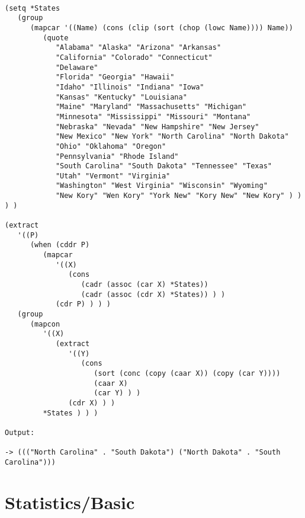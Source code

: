 \begin{verbatim}

(setq *States
   (group
      (mapcar '((Name) (cons (clip (sort (chop (lowc Name)))) Name))
         (quote
            "Alabama" "Alaska" "Arizona" "Arkansas"
            "California" "Colorado" "Connecticut"
            "Delaware"
            "Florida" "Georgia" "Hawaii"
            "Idaho" "Illinois" "Indiana" "Iowa"
            "Kansas" "Kentucky" "Louisiana"
            "Maine" "Maryland" "Massachusetts" "Michigan"
            "Minnesota" "Mississippi" "Missouri" "Montana"
            "Nebraska" "Nevada" "New Hampshire" "New Jersey"
            "New Mexico" "New York" "North Carolina" "North Dakota"
            "Ohio" "Oklahoma" "Oregon"
            "Pennsylvania" "Rhode Island"
            "South Carolina" "South Dakota" "Tennessee" "Texas"
            "Utah" "Vermont" "Virginia"
            "Washington" "West Virginia" "Wisconsin" "Wyoming"
            "New Kory" "Wen Kory" "York New" "Kory New" "New Kory" ) ) ) )

(extract
   '((P)
      (when (cddr P)
         (mapcar
            '((X)
               (cons
                  (cadr (assoc (car X) *States))
                  (cadr (assoc (cdr X) *States)) ) )
            (cdr P) ) ) )
   (group
      (mapcon
         '((X)
            (extract
               '((Y)
                  (cons
                     (sort (conc (copy (caar X)) (copy (car Y))))
                     (caar X)
                     (car Y) ) )
               (cdr X) ) )
         *States ) ) )

Output:

-> ((("North Carolina" . "South Dakota") ("North Dakota" . "South Carolina")))

\end{verbatim}

\section*{Statistics/Basic}

